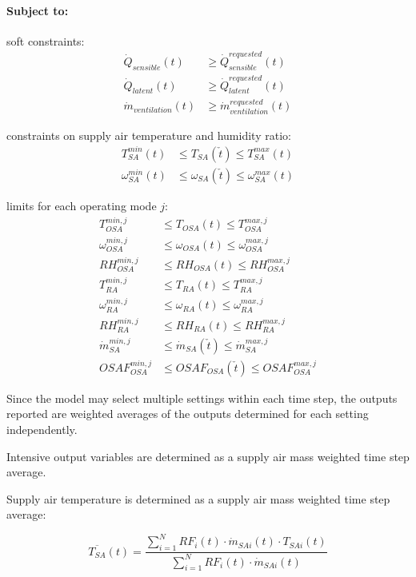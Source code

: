 \paragraph{Subject to:}

soft constraints:
\begin{align}
	\dot{Q}_{sensible}(t) & \geq \dot{Q}_{sensible}^{requested}(t) \\
	\dot{Q}_{latent}(t)   & \geq \dot{Q}_{latent}^{requested}(t) \\
	\dot{m}_{ventilation}(t) & \geq \dot{m}_{ventilation}^{requested}(t)
\end{align}

constraints on supply air temperature and humidity ratio:
\begin{align}
	T_{SA}^{min}(t)      & \leq T_{SA}(\check{t})      \leq T_{SA}^{max}(t) \\
	\omega_{SA}^{min}(t) & \leq \omega_{SA}(\check{t}) \leq \omega_{SA}^{max}(t)
\end{align}

limits for each operating mode $j$:
\begin{align}
	T_{OSA}^{min,j} & \leq T_{OSA}(t) \leq T_{OSA}^{max,j} \\
	\omega_{OSA}^{min,j} & \leq \omega_{OSA}(t) \leq \omega_{OSA}^{max,j} \\
	RH_{OSA}^{min,j} & \leq RH_{OSA}(t) \leq RH_{OSA}^{max,j} \\
	T_{RA}^{min,j} & \leq T_{RA}(t) \leq T_{RA}^{max,j} \\
	\omega_{RA}^{min,j} & \leq \omega_{RA}(t) \leq \omega_{RA}^{max,j} \\
	RH_{RA}^{min,j} & \leq RH_{RA}(t) \leq RH_{RA}^{max,j} \\
	\dot{m}_{SA}^{min,j} & \leq \dot{m}_{SA}(\check{t}) \leq \dot{m}_{SA}^{max,j} \\
	OSAF_{OSA}^{min,j} & \leq OSAF_{OSA}(\check{t}) \leq OSAF_{OSA}^{max,j}
\end{align}

Since the model may select multiple settings within each time step, the outputs reported are weighted averages of the outputs determined for each setting independently.

Intensive output variables are determined as a supply air mass weighted time step average.

Supply air temperature is determined as a supply air mass weighted time step average:

\begin{equation}
	\overline{T_{SA}}(t) = \frac{\sum_{i=1}^{N}RF_{i}(t) \cdot \dot{m}_{SAi}(t) \cdot T_{SAi}(t)} {\sum_{i=1}^{N}RF_{i}(t) \cdot \dot{m}_{SAi}(t)}
\end{equation}

